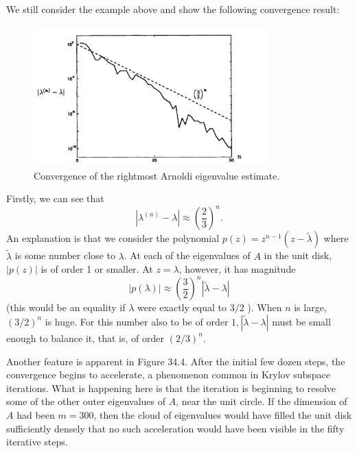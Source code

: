  We still consider the example above and show the following convergence result: 
 \begin{figure}[H]
    \centering
    \includegraphics[width=0.8\textwidth]{figures/33-3.png}
    \caption{Convergence of the rightmost Arnoldi eigenvalue estimate.}
 \end{figure}
 Firstly, we can see that 
 \[
    |\lambda ^{(n)} - \lambda | \approx \left( \frac{2}{3} \right) ^{n}. 
 \]
 An explanation is that we consider the polynomial $ p(z) = z^{n-1}(z-\tilde \lambda ) $ where $ \tilde \lambda  $ is some number close to $ \lambda  $. At each of the eigenvalues of $A$ in the unit disk, $|p(z)|$ is of order 1 or smaller. At $z=\lambda$, however, it has magnitude
 $$
 |p(\lambda)| \approx\left(\frac{3}{2}\right)^n|\tilde{\lambda}-\lambda|
 $$
 (this would be an equality if $\lambda$ were exactly equal to $3 / 2$ ). When $n$ is large, $(3 / 2)^n$ is huge. For this number also to be of order $1,|\tilde{\lambda}-\lambda|$ must be small enough to balance it, that is, of order $(2 / 3)^n$. 

 Another feature is apparent in Figure 34.4. After the initial few dozen steps, the convergence begins to accelerate, a phenomenon common in Krylov subspace iterations. What is happening here is that the iteration is beginning to resolve some of the other outer eigenvalues of $A$, near the unit circle. If the dimension of $A$ had been $m=300$, then the cloud of eigenvalues would have filled the unit disk sufficiently densely that no such acceleration would have been visible in the fifty iterative steps. 